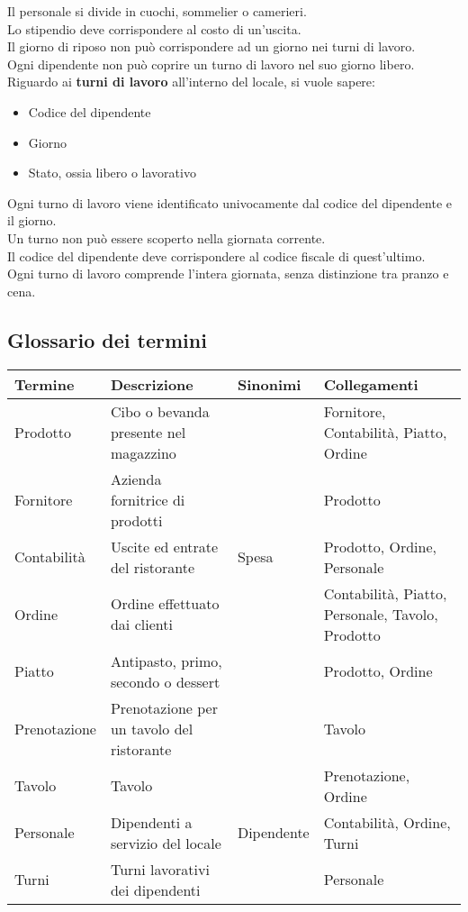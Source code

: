Il personale si divide in cuochi, sommelier o camerieri.\\
Lo stipendio deve corrispondere al costo di un'uscita. \\
Il giorno di riposo non può corrispondere ad un giorno nei turni di lavoro. \\
Ogni dipendente non può coprire un turno di lavoro nel suo giorno libero. \medskip \\
Riguardo ai \textbf{turni di lavoro} all’interno del locale, si vuole sapere:
\begin{itemize}
    \item Codice del dipendente
    \item Giorno
    \item Stato, ossia libero o lavorativo
\end{itemize}
Ogni turno di lavoro viene identificato univocamente dal codice del dipendente e il giorno.\\
Un turno non può essere scoperto nella giornata corrente. \\
Il codice del dipendente deve corrispondere al codice fiscale di quest'ultimo. \\
Ogni turno di lavoro comprende l'intera giornata, senza distinzione tra pranzo e cena.\medskip \\

\subsection{Glossario dei termini}
\begin{longtable}{p{2.5cm} p{4.5cm} p{2cm} p{5cm}}
    \toprule
    \textbf{Termine} & \textbf{Descrizione} & \textbf{Sinonimi} & \textbf{Collegamenti}\\ \midrule
    Prodotto & Cibo o bevanda presente nel magazzino&&Fornitore, Contabilità, Piatto, Ordine\\ \midrule
    Fornitore & Azienda fornitrice di prodotti & & Prodotto \\ \midrule
    Contabilità & Uscite ed entrate del ristorante&Spesa&Prodotto, Ordine, Personale \\ \midrule
    Ordine&Ordine effettuato dai clienti&&Contabilità, Piatto, Personale, Tavolo, Prodotto \\ \midrule
    Piatto&Antipasto, primo, secondo o dessert&&Prodotto, Ordine \\ \midrule
    Prenotazione&Prenotazione per un tavolo del ristorante&&Tavolo \\ \midrule
    Tavolo&Tavolo&&Prenotazione, Ordine\\ \midrule
    Personale&Dipendenti a servizio del locale&Dipendente&Contabilità, Ordine, Turni\\ \midrule
    Turni&Turni lavorativi dei dipendenti&&Personale	\\ \midrule
\end{longtable}

